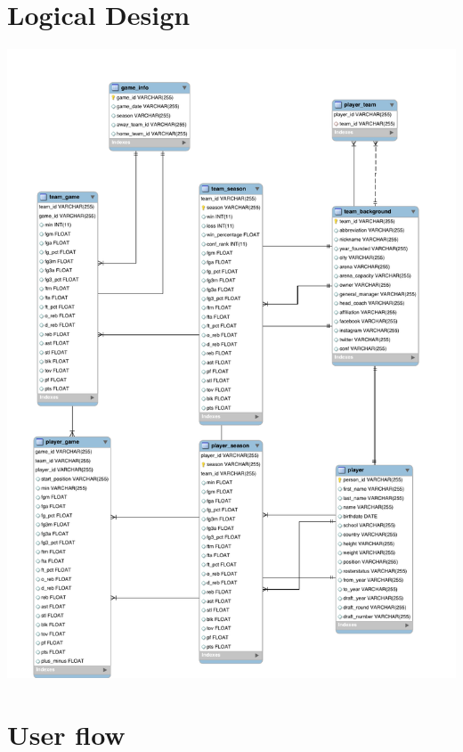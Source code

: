 \documentclass[a4paper,12pt]{article} %
\begin{document}
\section{Logical Design}
\begin{center}
\includegraphics[width=1\textwidth]{schema}
\end{center}

\section{User flow}
\end{document}
